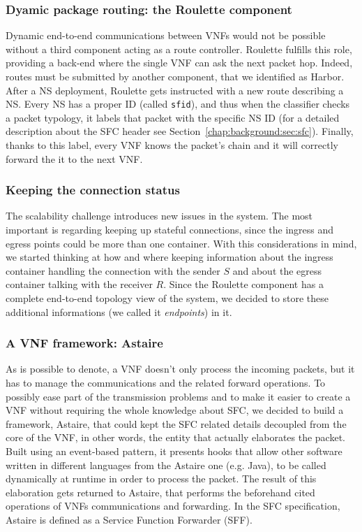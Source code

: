\subsubsection{Dyamic package routing: the Roulette component}
\label{chap:prjan:sec:tech:sub:SFC:sub:roulette}
Dynamic end-to-end communications between VNFs would not be possible without a
third component acting as a route controller. Roulette fulfills this role,
providing a back-end where the single VNF can ask the next packet hop. Indeed,
routes must be submitted by another component, that we identified as Harbor.
After a NS deployment, Roulette gets instructed with a new route describing a
NS. Every NS has a proper ID (called \verb!sfid!), and thus when the classifier
checks a packet typology, it labels that packet with the specific NS ID (for a
detailed description about the SFC header see
Section~\ref{chap:background:sec:sfc}). Finally, thanks to this label, every VNF
knows the packet's chain and it will correctly forward the it to the next VNF.

\subsubsection{Keeping the connection status}
The scalability challenge introduces new issues in the system. The most
important is regarding keeping up stateful connections, since the ingress and
egress points could be more than one container. With this considerations in
mind, we started thinking at how and where keeping information about the ingress
container handling the connection with the sender $S$ and about the egress
container talking with the receiver $R$. Since the Roulette component has a
complete end-to-end topology view of the system, we decided to store these
additional informations (we called it \emph{endpoints}) in it.

\subsubsection{A VNF framework: Astaire}
As is possible to denote, a VNF doesn't only process the incoming packets, but
it has to manage the communications and the related forward operations. To
possibly ease part of the transmission problems and to make it easier to create
a VNF without requiring the whole knowledge about SFC, we decided to build a
framework, Astaire, that could kept the SFC related details decoupled from the
core of the VNF, in other words, the entity that actually elaborates the packet.
Built using an event-based pattern, it presents hooks that allow other software
written in different languages from the Astaire one (e.g. Java), to be called
dynamically at runtime in order to process the packet. The result of this
elaboration gets returned to Astaire, that performs the beforehand cited
operations of VNFs communications and forwarding. In the SFC specification,
Astaire is defined as a Service Function Forwarder (SFF).


